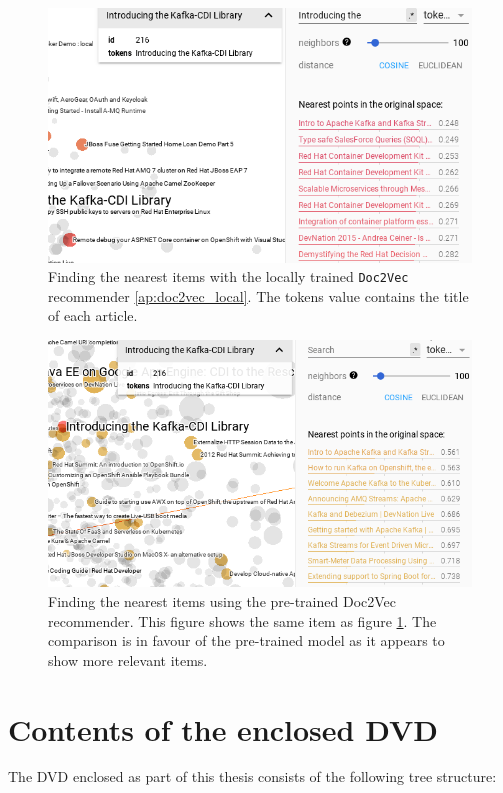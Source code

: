 \begin{figure}[H]
    \centering
    \includegraphics[scale=0.58]{obrazky-figures/doc2vec_local5.png}
    \caption{Finding the nearest items with the locally trained \texttt{Doc2Vec} recommender \ref{ap:doc2vec_local}. The tokens value contains the title of each article.}
    \label{ap:doc2vec_local_detail}
\end{figure}

\begin{figure}[H]
    \centering
    \includegraphics[scale=0.58]{obrazky-figures/doc2vec_wiki3.png}
    \caption{Finding the nearest items using the pre-trained Doc2Vec recommender. This figure shows the same item as figure \ref{ap:doc2vec_local_detail}. The comparison is in favour of the pre-trained model as it appears to show more relevant items.}
\end{figure}


\chapter{Contents of the enclosed DVD}
The DVD enclosed as part of this thesis consists of the following tree structure: \\

